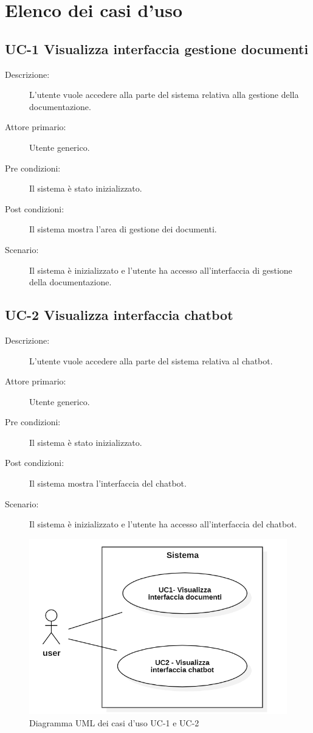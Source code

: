 \newpage

\section{Elenco dei casi d'uso}

\subsection{UC-1 Visualizza interfaccia gestione documenti}
\begin{description}
    \item[Descrizione:] L’utente vuole accedere alla parte del sistema relativa alla gestione della documentazione.
    \item[Attore primario:] Utente generico.
    \item[Pre condizioni:]  Il sistema è stato inizializzato.
    \item[Post condizioni:] Il sistema mostra l’area di gestione dei documenti.
    \item[Scenario:] Il sistema è inizializzato e l’utente ha accesso all’interfaccia di gestione della documentazione.
\end{description}

\subsection{UC-2 Visualizza interfaccia chatbot}
\begin{description}
    \item[Descrizione:] L’utente vuole accedere alla parte del sistema relativa al chatbot.
    \item[Attore primario:] Utente generico.
    \item[Pre condizioni:] Il sistema è stato inizializzato.
    \item[Post condizioni:] Il sistema mostra l’interfaccia del chatbot.
    \item[Scenario:] Il sistema è inizializzato e l’utente ha accesso all’interfaccia del chatbot.
\end{description}

\begin{figure}[H]
    \centering
    \includegraphics[width=0.7\linewidth]{UC1-2.PNG}
    \caption{Diagramma UML dei casi d'uso UC-1 e UC-2}
    \label{fig:UC1-2}
\end{figure}

